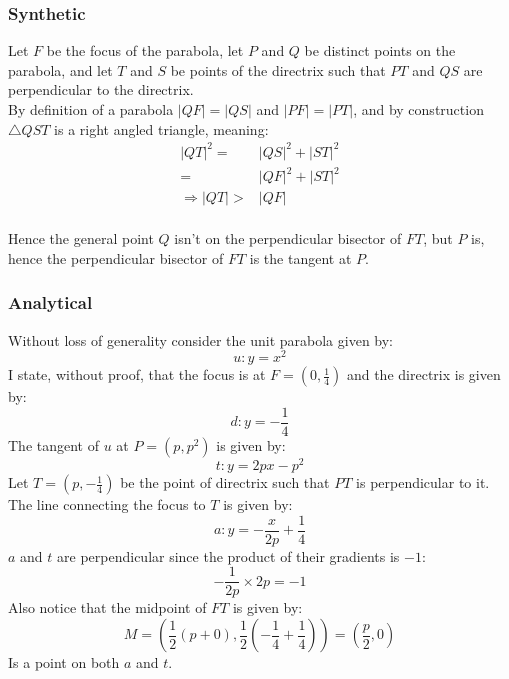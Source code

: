 \subsubsection{Synthetic}
\begin{center}
\end{center}
Let $F$ be the focus of the parabola,
let $P$ and $Q$ be distinct points on the parabola,
and let $T$ and $S$ be points of the directrix such that $PT$ and $QS$ are perpendicular to the directrix.
\\

By definition of a parabola $|QF|=|QS|$ and $|PF|=|PT|$,
and by construction $\triangle QST$ is a right angled triangle,
meaning:
\begin{equation*}
\begin{aligned}
|QT|^2 =& |QS|^2+|ST|^2 \\
=& |QF|^2+|ST|^2 \\
\Rightarrow |QT| >& |QF| \\
\end{aligned}
\end{equation*}

Hence the general point $Q$ isn't on the perpendicular bisector of $FT$,
but $P$ is, 
hence the perpendicular bisector of $FT$ is the tangent at $P$.

\subsubsection{Analytical}
Without loss of generality consider the unit parabola given by:
\[u: y=x^2\]
I state, without proof, that the focus is at $F=\left(0,\frac{1}{4}\right)$ and the directrix is given by:
\[d: y = -\frac{1}{4}\]
The tangent of $u$ at $P=(p,p^2)$ is given by:
\[t: y = 2px-p^2\]
Let $T=\left(p,-\frac{1}{4}\right)$ be the point of directrix such that $PT$ is perpendicular to it.
The line connecting the focus to $T$ is given by:
\[a: y= -\frac{x}{2p}+\frac{1}{4}\]
$a$ and $t$ are perpendicular since the product of their gradients is $-1$:
\[-\frac{1}{2p}\times 2p = -1\]
Also notice that the midpoint of $FT$ is given by:
\[M=\left(\frac{1}{2}(p+0),\frac{1}{2}\left(-\frac{1}{4}+\frac{1}{4}\right)\right) = \left(\frac{p}{2},0\right)\]
Is a point on both $a$ and $t$.

